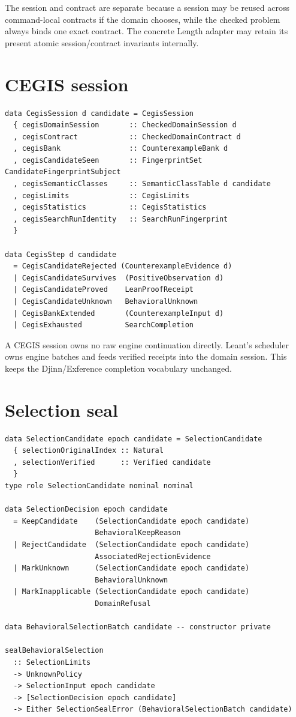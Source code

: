\documentclass[11pt,oneside]{report}
\begin{document}
The session and contract are separate because a session may be reused across command-local contracts if the domain chooses, while the checked problem always binds one exact contract. The concrete Length adapter may retain its present atomic session/contract invariants internally.

\section{CEGIS session}

\begin{lstlisting}[language=HaskellX,caption={Candidate-level CEGIS state.}]
data CegisSession d candidate = CegisSession
  { cegisDomainSession       :: CheckedDomainSession d
  , cegisContract            :: CheckedDomainContract d
  , cegisBank                :: CounterexampleBank d
  , cegisCandidateSeen       :: FingerprintSet CandidateFingerprintSubject
  , cegisSemanticClasses     :: SemanticClassTable d candidate
  , cegisLimits              :: CegisLimits
  , cegisStatistics          :: CegisStatistics
  , cegisSearchRunIdentity   :: SearchRunFingerprint
  }

data CegisStep d candidate
  = CegisCandidateRejected (CounterexampleEvidence d)
  | CegisCandidateSurvives  (PositiveObservation d)
  | CegisCandidateProved    LeanProofReceipt
  | CegisCandidateUnknown   BehavioralUnknown
  | CegisBankExtended       (CounterexampleInput d)
  | CegisExhausted          SearchCompletion
\end{lstlisting}

A CEGIS session owns no raw engine continuation directly. Leant's scheduler owns engine batches and feeds verified receipts into the domain session. This keeps the Djinn/Exference completion vocabulary unchanged.

\section{Selection seal}

\begin{lstlisting}[language=HaskellX,caption={Nominal selection seal in more detail.}]
data SelectionCandidate epoch candidate = SelectionCandidate
  { selectionOriginalIndex :: Natural
  , selectionVerified      :: Verified candidate
  }
type role SelectionCandidate nominal nominal

data SelectionDecision epoch candidate
  = KeepCandidate    (SelectionCandidate epoch candidate)
                     BehavioralKeepReason
  | RejectCandidate  (SelectionCandidate epoch candidate)
                     AssociatedRejectionEvidence
  | MarkUnknown      (SelectionCandidate epoch candidate)
                     BehavioralUnknown
  | MarkInapplicable (SelectionCandidate epoch candidate)
                     DomainRefusal

data BehavioralSelectionBatch candidate -- constructor private

sealBehavioralSelection
  :: SelectionLimits
  -> UnknownPolicy
  -> SelectionInput epoch candidate
  -> [SelectionDecision epoch candidate]
  -> Either SelectionSealError (BehavioralSelectionBatch candidate)
\end{lstlisting}
\end{document}
